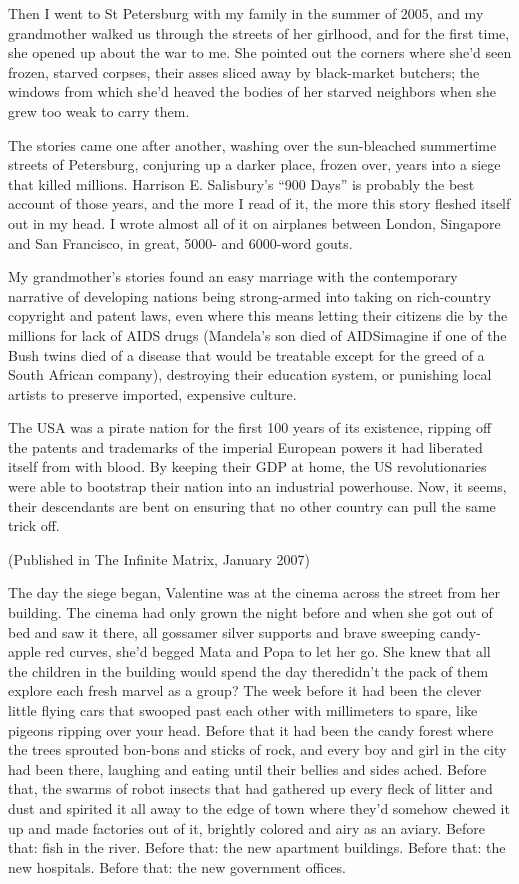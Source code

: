 Then I went to St Petersburg with my family in the summer of 2005,
and my grandmother walked us through the streets of her girlhood,
and for the first time, she opened up about the war to me. She
pointed out the corners where she’d seen frozen, starved corpses,
their asses sliced away by black-market butchers; the windows from
which she’d heaved the bodies of her starved neighbors when she
grew too weak to carry them.

The stories came one after another, washing over the sun-bleached
summertime streets of Petersburg, conjuring up a darker place,
frozen over, years into a siege that killed millions. Harrison E.
Salisbury’s “900 Days” is probably the best account of those years,
and the more I read of it, the more this story fleshed itself out
in my head. I wrote almost all of it on airplanes between London,
Singapore and San Francisco, in great, 5000- and 6000-word gouts.

My grandmother’s stories found an easy marriage with the
contemporary narrative of developing nations being strong-armed
into taking on rich-country copyright and patent laws, even where
this means letting their citizens die by the millions for lack of
AIDS drugs (Mandela’s son died of AIDS\dash{}imagine if one of the Bush
twins died of a disease that would be treatable except for the
greed of a South African company), destroying their education
system, or punishing local artists to preserve imported, expensive
culture.

The USA was a pirate nation for the first 100 years of its
existence, ripping off the patents and trademarks of the imperial
European powers it had liberated itself from with blood. By keeping
their GDP at home, the US revolutionaries were able to bootstrap
their nation into an industrial powerhouse. Now, it seems, their
descendants are bent on ensuring that no other country can pull the
same trick off.

\textsf{(Published in The Infinite Matrix, January 2007)}

The day the siege began, Valentine was at the cinema across the
street from her building. The cinema had only grown the night
before and when she got out of bed and saw it there, all gossamer
silver supports and brave sweeping candy-apple red curves, she’d
begged Mata and Popa to let her go. She knew that all the children
in the building would spend the day there\dash{}didn’t the pack of them
explore each fresh marvel as a group? The week before it had been
the clever little flying cars that swooped past each other with
millimeters to spare, like pigeons ripping over your head. Before
that it had been the candy forest where the trees sprouted bon-bons
and sticks of rock, and every boy and girl in the city had been
there, laughing and eating until their bellies and sides ached.
Before that, the swarms of robot insects that had gathered up every
fleck of litter and dust and spirited it all away to the edge of
town where they’d somehow chewed it up and made factories out of
it, brightly colored and airy as an aviary. Before that: fish in
the river. Before that: the new apartment buildings. Before that:
the new hospitals. Before that: the new government offices.

